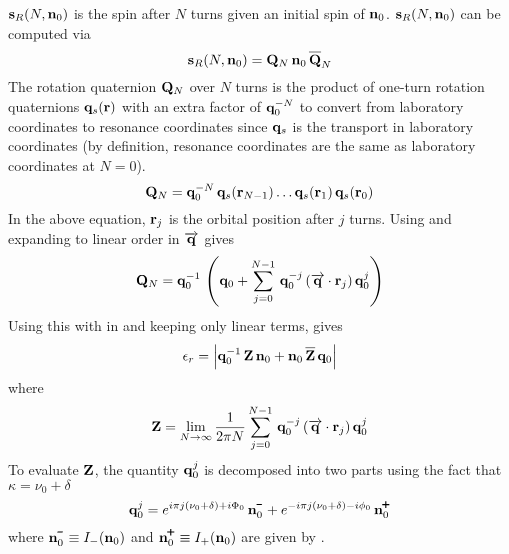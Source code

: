 ${\bf s}_R(N, {\bf n}_0)$ is the spin after $N$ turns given an initial spin of ${\bf n}_0$.  ${\bf s}_R(N,
{\bf n}_0)$ can be computed via
\begin{equation}
  \bfs_R(N, \bfn_0) = \bfQ_N \, \bfn_0 \, \BAR\bfQ_N
  \label{sQnQ}
\end{equation}
The rotation quaternion ${\bf Q}_N$ over $N$ turns is the product of one-turn rotation quaternions ${\bf q}_s({\bf r})$
with an extra factor of ${\bf q}_0^{-N}$ to convert from laboratory coordinates to resonance coordinates since
${\bf q}_s$ is the transport in laboratory coordinates (by definition, resonance coordinates are the same as 
laboratory coordinates at $N = 0$).
\begin{equation}
  {\bf Q}_N = {\bf q}_0^{-N} \, {\bf q}_s({\bf r}_{N-1}) \ldots {\bf q}_s({\bf r}_1) \, {\bf q}_s({\bf r}_0)
  \label{Qqqr}
\end{equation}
In the above equation, ${\bf r}_j$ is the orbital position after $j$ turns. 
Using  and expanding to linear order in $\overrightarrow{{\bf q}}$ gives
\begin{equation}
  {\bf Q}_N = {\bf q}_0^{-1} \, \left( 
  {\bf q}_0 + \sum_{j = 0}^{N-1} \, {\bf q}_0^{-j}
  \left( \overrightarrow{{\bf q}} \cdot {\bf r}_j \right) {\bf q}_0^{j}
  \right)
  \label{qqqjn}
\end{equation}
Using this with  in  and keeping only linear terms, gives
\begin{equation}
  \epsilon_r = \left|
    \bfq_0^{-1} \, \bfZ \, \bfn_0 + 
    \bfn_0 \, \BAR\bfZ \, \bfq_0
    \right| \label{eqZnn}
\end{equation}
where
\begin{equation}
  {\bf Z} = \lim_{N \rightarrow \infty} 
  \frac{1}{2 \pi N} 
  \sum_{j = 0}^{N-1} \, {\bf q}_0^{-j} \left( \overrightarrow{{\bf q}} \cdot {\bf r}_j \right) {\bf q}_0^{j}
  \label{Z}
\end{equation}
To evaluate ${\bf Z}$, the quantity ${\bf q}_0^j$ is decomposed into two parts using the fact that $\kappa
= \nu_0 + \delta$
\begin{equation}
  \bfq_0^j = e^{ i \pi j (\nu_0 + \delta) + i \Phi_0} \, \bfn_0^\mmin + 
             e^{-i \pi j (\nu_0 + \delta) - i \phi_0} \, \bfn_0^\ppls
  \label{q12en}
\end{equation}
where $\bfn_0^\mmin \equiv I_-(\bfn_0)$ and $\bfn_0^\ppls \equiv I_+(\bfn_0)$ are
given by .

